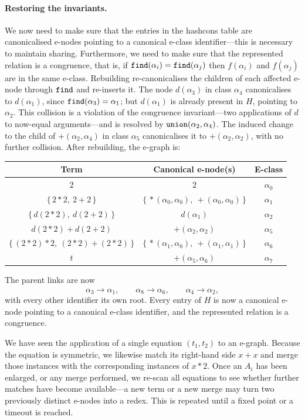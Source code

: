 \begin{example}
\paragraph{Restoring the invariants.}
We now need to make sure that the entries in the hashcons table are canonicalised e-nodes pointing to a canonical e-class identifier---this is necessary to maintain sharing.
Furthermore, we need to make sure that the represented relation is a congruence, that is, if $\texttt{find}(\alpha_i) = \texttt{find}(\alpha_j)$ then $f(\alpha_i)$ and $f(\alpha_j)$ are in the same e-class.
Rebuilding re-canonicalises the children of each affected e-node through
$\texttt{find}$ and re-inserts it. The node $d(\alpha_3)$ in class $\alpha_4$
canonicalises to $d(\alpha_1)$, since $\texttt{find}(\alpha_3) = \alpha_1$; but
$d(\alpha_1)$ is already present in $H$, pointing to $\alpha_2$. This
collision is a violation of the congruence invariant---two applications
of $d$ to now-equal arguments---and is resolved by
$\texttt{union}(\alpha_2, \alpha_4)$. The induced change to the child of
$+(\alpha_2, \alpha_4)$ in class $\alpha_5$ canonicalises it to
$+(\alpha_2, \alpha_2)$, with no further collision. After rebuilding, the
e-graph is:
\begin{center}
\begin{tabular}{c|c|c}
  Term & Canonical e-node(s) & E-class\\
  \hline
  $2$ & $2$ & $\alpha_0$\\
  $\{\,2{\ast}2,\ 2{+}2\,\}$ & $\{\,{\ast}(\alpha_0, \alpha_0),\ {+}(\alpha_0, \alpha_0)\,\}$ & $\alpha_1$\\
  $\{\,d(2{\ast}2),\ d(2{+}2)\,\}$ & $d(\alpha_1)$ & $\alpha_2$\\
  $d(2{\ast}2){+}d(2{+}2)$ & $+(\alpha_2, \alpha_2)$ & $\alpha_5$\\
  $\{\,(2{\ast}2){\ast}2,\ (2{\ast}2){+}(2{\ast}2)\,\}$ & $\{\,{\ast}(\alpha_1, \alpha_0),\ {+}(\alpha_1, \alpha_1)\,\}$ & $\alpha_6$\\
  $t$ & $+(\alpha_5, \alpha_6)$ & $\alpha_7$\\
\end{tabular}
\end{center}
The parent links are now
\[
\alpha_3 \xrightarrow{} \alpha_1, \qquad
\alpha_8 \xrightarrow{} \alpha_6, \qquad
\alpha_4 \xrightarrow{} \alpha_2,
\]
with every other identifier its own root.
Every entry of $H$ is now a
canonical e-node pointing to a canonical e-class identifier, and the
represented relation is a congruence.

We have seen the application of a single equation $(t_1, t_2)$ to an e-graph.
Because the equation is symmetric, we likewise match its right-hand side $x+x$ and merge those instances with the corresponding instances of $x \ast 2$.
Once an $A_i$ has been enlarged, or any merge performed, we re-scan all equations to see whether further matches have become available---a new term or a new merge may turn two previously distinct e-nodes into a redex.
This is repeated until a fixed point or a timeout is reached.
\end{example}


